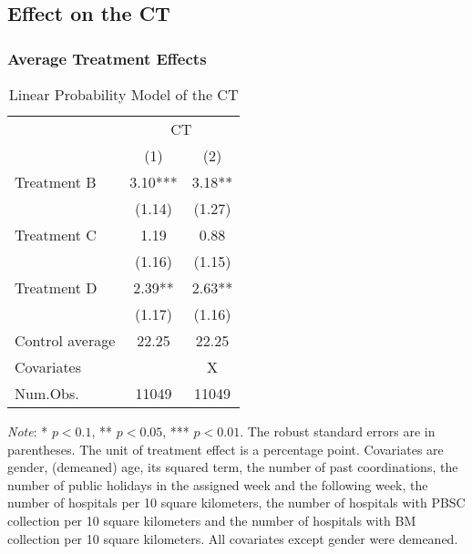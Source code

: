 \documentclass[12pt, a4paper]{article}
\begin{document}
\hypertarget{effect-on-the-ct}{%
\subsection{Effect on the CT}\label{effect-on-the-ct}}

\hypertarget{average-treatment-effects}{%
\subsubsection{Average Treatment Effects}\label{average-treatment-effects}}

\begin{table}[H]

\caption{\label{tab:lm-test}Linear Probability Model of the CT}
\centering
\fontsize{8}{10}\selectfont
\begin{threeparttable}
\begin{tabular}[t]{lcc}
\toprule
\multicolumn{1}{c}{ } & \multicolumn{2}{c}{CT} \\
\cmidrule(l{3pt}r{3pt}){2-3}
  & (1) & (2)\\
\midrule
Treatment B & \num{3.10}*** & \num{3.18}**\\
 & (\num{1.14}) & (\num{1.27})\\
Treatment C & \num{1.19} & \num{0.88}\\
 & (\num{1.16}) & (\num{1.15})\\
Treatment D & \num{2.39}** & \num{2.63}**\\
 & (\num{1.17}) & (\num{1.16})\\
\midrule
Control average & 22.25 & 22.25\\
Covariates &  & X\\
Num.Obs. & \num{11049} & \num{11049}\\
\bottomrule
\end{tabular}
\begin{tablenotes}
\item \emph{Note}: * $p < 0.1$, ** $p < 0.05$, *** $p < 0.01$. The robust standard errors are in parentheses. The unit of treatment effect is a percentage point. Covariates are gender, (demeaned) age, its squared term, the number of past coordinations, the number of public holidays in the assigned week and the following week, the number of hospitals per 10 square kilometers, the number of hospitals with PBSC collection per 10 square kilometers and the number of hospitals with BM collection per 10 square kilometers. All covariates except gender were demeaned.
\end{tablenotes}
\end{threeparttable}
\end{table}
\end{document}
